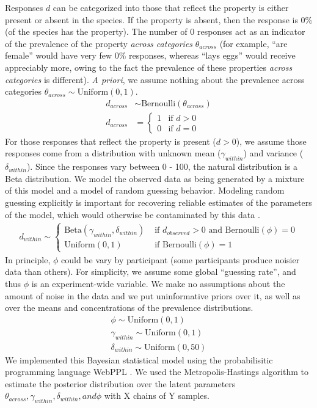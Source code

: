 \documentclass[10pt,letterpaper]{article}
\begin{document}
Responses $d$ can be categorized into those that reflect the property is either present or absent in the species. 
If the property is absent, then the response is 0\% (of the species has the property). 
The number of 0 responses act as an indicator of the prevalence of the property \emph{across categories} $\theta_{across}$ (for example, ``are female'' would have very few 0\% responses, whereas ``lays eggs'' would receive appreciably more, owing to the fact the prevalence of these properties \emph{across categories} is different). \emph{A priori}, we assume nothing about the prevalence across categories $\theta_{across} \sim \text{Uniform} (0, 1)$. 
%
\begin{align*}
d_{across} & \sim \text{Bernoulli}(\theta_{across}) \\
d_{across} & = \begin{cases}
				1 & \mbox{if } d > 0 \\
				0 & \mbox{if } d = 0 
				\end{cases}
\end{align*}
%
For those responses that reflect the property is present ($d > 0$), we assume those responses come from a distribution with unknown mean ($\gamma_{within}$) and variance ($\delta_{within}$). 
Since the responses vary between 0 - 100, the natural distribution is a Beta distribution. 
We model the observed data as being generated by a mixture of this model and a model of random guessing behavior. 
Modeling random guessing explicitly is important for recovering reliable estimates of the parameters of the model, which would otherwise be contaminated by this data \cite{LW2014}. 
%
\begin{align*}
d_{within} \sim \begin{cases}
					\text{Beta}(\gamma_{within}, \delta_{within})  &  \mbox{ if } d_{observed} > 0 \text{ and }  \text{Bernoulli} (\phi) = 0 \\
					\text{Uniform}(0,1) & \mbox{ if } \text{Bernoulli} (\phi) = 1
				\end{cases}
\end{align*}
%
In principle, $\phi$ could be vary by participant (some participants produce noisier data than others). For simplicity, we assume some global ``guessing rate'', and thus $\phi$ is an experiment-wide variable.
We make no assumptions about the amount of noise in the data and we put uninformative priors over it, as well as over the means and concentrations of the prevalence distributions. 
%
\begin{align*}
 \phi \sim \text{Uniform}(0,1) \\
\gamma_{within} \sim \text{Uniform}(0,1) \\
\delta_{within} \sim \text{Uniform}(0,50)
\end{align*}
%
We implemented this Bayesian statistical model using the probabilisitic programming language WebPPL \cite{dippl}. We used the Metropolis-Hastings algorithm to estimate the posterior distribution over the latent parameters $\theta_{across}, \gamma_{within}, \delta_{within}, and \phi$ with X chains of Y samples.
\end{document}
